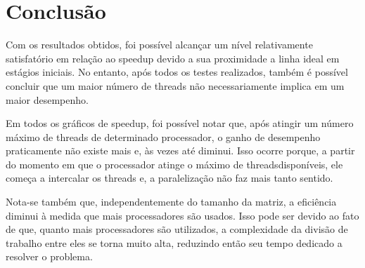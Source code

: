 \documentclass[journal, twoside]{IEEEtran}
\begin{document}
\section{Conclusão}
Com os resultados obtidos, foi possível alcançar um nível relativamente satisfatório em relação ao speedup devido a sua proximidade a linha ideal em estágios iniciais. No entanto, após todos os testes realizados, também é possível concluir que um maior número de threads não necessariamente implica em um maior desempenho. \par \quad Em todos os gráficos de speedup, foi possível notar que, após atingir um número máximo de threads de determinado processador, o ganho de desempenho praticamente não existe mais e, às vezes até diminui. Isso ocorre porque, a partir do momento em que o processador atinge o máximo de threadsdisponíveis, ele começa a intercalar os threads e, a paralelização não faz mais tanto sentido.
\par \quad Nota-se também que, independentemente do tamanho da matriz, a eficiência diminui à medida que mais processadores são usados. Isso pode ser devido ao fato de que, quanto mais processadores são utilizados, a complexidade da divisão de trabalho entre eles se torna muito alta, reduzindo então seu tempo dedicado a resolver o problema.




%
\end{document}
